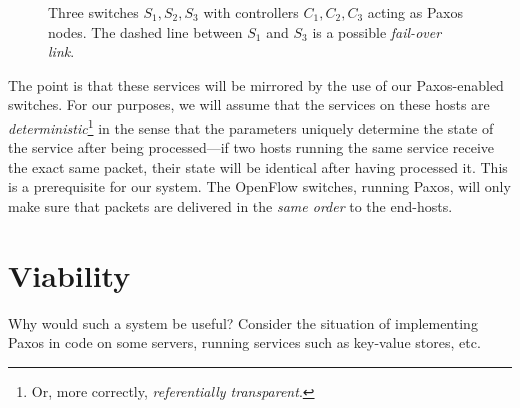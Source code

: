 \begin{figure}[H]
  \centering
  \caption{Three switches $S_1, S_2, S_3$ with controllers $C_1, C_2, C_3$ acting as Paxos nodes.
           The dashed line between $S_1$ and $S_3$ is a possible \textit{fail-over link}.}
  \label{figure:graph.three.switches}
\end{figure}

The point is that these services will be mirrored by the use of our
Paxos-enabled switches.  For our purposes, we will assume that the services
on these hosts are \textit{deterministic}\footnote{Or,
more correctly, \textit{referentially transparent}.} in the sense that the parameters uniquely determine the
state of the service after being processed---if two hosts running the
same service receive the exact same packet, their state will be
identical after having processed it.  This is a prerequisite for our
system.  The OpenFlow switches, running Paxos, will only make sure that
packets are delivered in the \textit{same order} to the end-hosts.

\section{Viability}

Why would such a system be useful? Consider the situation of implementing
Paxos in code on some servers, running services such as key-value
stores, etc.

